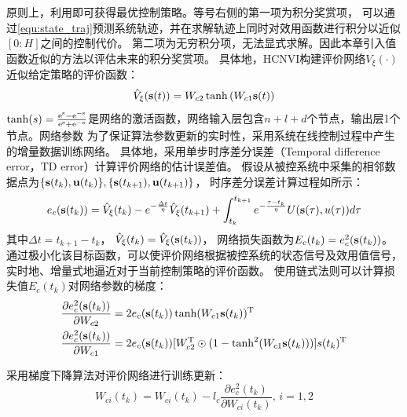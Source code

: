 原则上，利用即可获得最优控制策略。等号右侧的第一项为积分奖赏项，
可以通过\eqref{equ:state_traj}预测系统轨迹，并在求解轨迹上同时对效用函数进行积分以近似$[0:H]$之间的控制代价。
第二项为无穷积分项，无法显式求解。因此本章引入值函数近似的方法以评估未来的积分奖赏项。
具体地，HCNVI构建评价网络$V_\xi(\cdot)$近似给定策略的评价函数：
\begin{equation}
\label{equ:criticNN} \hat { V }_\xi ( \mathbf s(t) ) = W _ { c 2 } \tanh \left( W _
{ c 1 }  \mathbf s(t)  \right)
\end{equation}
$\tanh(s)=\frac{\rm e^{s}-\rm e^{-s}}{\rm e^{s}+\rm
e^{-s}}$是网络的激活函数，网络输入层包含$n+l+d$个节点，输出层1个节点。网络参数
为了保证算法参数更新的实时性，采用系统在线控制过程中产生的增量数据训练网络。
具体地，采用单步时序差分误差（Temporal difference error，TD error）\cite{Sutton2018}计算评价网络的估计误差值。
假设从被控系统中采集的相邻数据点为$\{\mathbf s(t_k), \mathbf u(t_k)\},\{\mathbf s(t_{k+1}), \mathbf u(t_{k+1})\}$，
时序差分误差计算过程如所示：
\begin{equation}
\label{equ:TDerror} e_{c }(\mathbf s(t_k))=\hat{V}_{\xi}(t_k)-e^{-\frac{\Delta t}{\eta}} \hat{V}_{\xi}(t_{k+1})+\int_{t_k}^{t_{k+1}}e^{-\frac{\tau-t_k}{\eta}}U(\mathbf s(\tau), u(\tau))d \tau
\end{equation}
其中$\Delta t=t_{k+1}-t_{k}$，
$\hat{V}_{\xi}(t_k)=\hat{V}_{\xi}(\mathbf s(t_k))$，
网络损失函数为$E_c(t_k)=e_c^2(\mathbf s(t_k))$。通过极小化该目标函数，可以使评价网络根据被控系统的状态信号及效用值信号，实时地、增量式地逼近对于当前控制策略的评价函数。
使用链式法则可以计算损失值$E_c(t_k)$对网络参数的梯度：
\begin{equation}
\begin{aligned}
\label{equ:critic_gradient} \dfrac{\partial e_c^2(\mathbf s(t_k))}{\partial
W_{c2}} & =2e_c(\mathbf s(t_k)) \tanh(W_{c1}\mathbf s(t_k))^{\rm T} 
\\ \dfrac{\partial
e_c^2(\mathbf s(t_k))}{\partial W_{c1}} & =2e_c(\mathbf s(t_k)) [W_{c2}^{\rm
T}\odot(1-\tanh^2(W_{c1}\mathbf s(t_k)))]\mathbf {\mathbf} s(t_k)^{\rm T}
\end{aligned}
\end{equation}

采用梯度下降算法对评价网络进行训练更新：
\begin{equation}
\label{equ:train_critic} W_{ci}(t_k)=W_{ci}(t_k)-l_{c} \frac{\partial
e_{c }^{2}(t_k)}{\partial W_{ci}(t_k)}\text{, }i=1,2
\end{equation}

